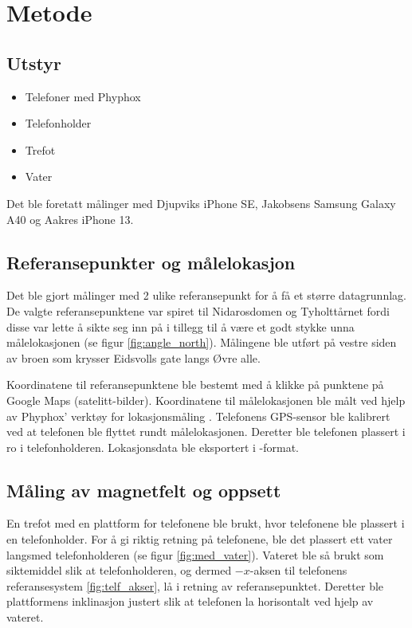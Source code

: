 \section{Metode}
\subsection{Utstyr}
\begin{itemize}
    \item Telefoner med Phyphox
    \item Telefonholder
    \item Trefot
    \item Vater
\end{itemize}
Det ble foretatt målinger med Djupviks iPhone SE, Jakobsens Samsung Galaxy A40 og Aakres iPhone 13. 

\subsection{Referansepunkter og målelokasjon}
Det ble gjort målinger med 2 ulike referansepunkt for å få et større datagrunnlag. De valgte referansepunktene var spiret til Nidarosdomen og Tyholttårnet fordi disse var lette å sikte seg inn på i tillegg til å være et godt stykke unna målelokasjonen (se figur \ref{fig:angle_north}). 
Målingene ble utført på vestre siden av broen som krysser Eidsvolls gate langs Øvre alle. 

Koordinatene til referansepunktene ble bestemt med å klikke på punktene på Google Maps (satelitt-bilder). 
Koordinatene til målelokasjonen ble målt ved hjelp av Phyphox' verktøy for lokasjonsmåling \cite{phyphox}. Telefonens GPS-sensor ble kalibrert ved at telefonen ble flyttet rundt målelokasjonen. 
Deretter ble telefonen plassert i ro i telefonholderen. 
Lokasjonsdata ble eksportert i -format.



\subsection{Måling av magnetfelt og oppsett}
En trefot med en plattform for telefonene ble brukt, hvor telefonene ble plassert i en telefonholder. For å gi riktig retning på telefonene, ble det plassert ett vater langsmed telefonholderen (se figur \ref{fig:med_vater}). Vateret ble så brukt som siktemiddel slik at telefonholderen, og dermed $-x$-aksen til telefonens referansesystem \ref{fig:telf_akser}, lå i retning av referansepunktet. Deretter ble plattformens inklinasjon justert slik at telefonen la horisontalt ved hjelp av vateret.

